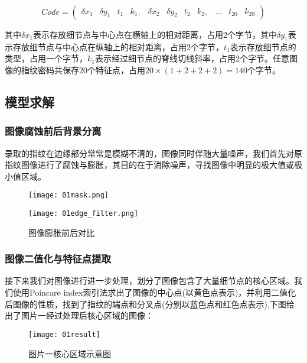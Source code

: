 \documentclass[withoutpreface,bwprint]{cumcmthesis} %
\begin{document}

\begin{equation}       %
Code= \left(                 %
\begin{array}{ccccccccccr}   %
	\delta x_{1} & \delta y_{1} & t_{1} & k_{1}, & \delta x_{2} & \delta y_{2} & t_{2} & k_{2}, & ... & t_{20} & k_{20}
\end{array}
\right)                 %
\end{equation}

其中$\delta x_{1}$表示存放细节点与中心点在横轴上的相对距离，占用2个字节，其中$\delta y_{1}$表示存放细节点与中心点在纵轴上的相对距离，占用2个字节，$t_{1}$表示存放细节点的类型，占用一个字节，$k_{1}$表示经过细节点的脊线切线斜率，占用2个字节。任意图像的指纹密码共保存20个特征点，占用$20×(1+2+2+2)=140$个字节。


\subsection{模型求解}
\subsubsection{图像腐蚀前后背景分离}
录取的指纹在边缘部分常常是模糊不清的，图像同时伴随大量噪声，我们首先对原指纹图像进行了腐蚀与膨胀，其目的在于消除噪声，寻找图像中明显的极大值或极小值区域。
\begin{figure}[H]
	\begin{minipage}[t]{0.5\textwidth}
		\centering
		\texttt{[image: 01mask.png]}
		\label{fig:01mask}
	\end{minipage}
	\qquad
	\begin{minipage}[t]{0.5\textwidth}
		\centering
		\texttt{[image: 01edge\_filter.png]}
		\label{01edge_filter}
	\end{minipage}
	\label{}
	\caption{图像膨胀前后对比}
\end{figure}

\subsubsection{图像二值化与特征点提取}
接下来我们对图像进行进一步处理，划分了图像包含了大量细节点的核心区域。我们使用Poincare index索引法求出了图像的中心点(以黄色点表示)，并利用二值化后图像的性质，找到了指纹的端点和分叉点(分别以蓝色点和红色点表示),下图给出了图片一经过处理后核心区域的图像：
\begin{figure}[!h]
	\centering
	\texttt{[image: 01result]}	
	\caption{图片一核心区域示意图}
\end{figure}
\end{document}
